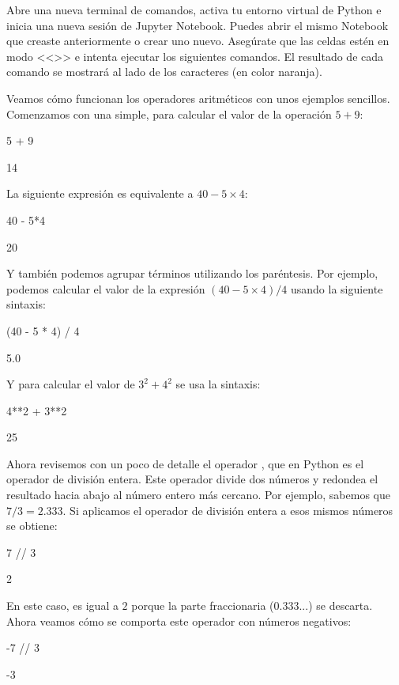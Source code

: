Abre una nueva terminal de comandos, activa tu entorno virtual de Python e inicia una nueva sesión de Jupyter Notebook. Puedes abrir el mismo Notebook que creaste anteriormente o crear uno nuevo. Asegúrate que las celdas estén en modo <<>> e intenta ejecutar los siguientes comandos. El resultado de cada comando se mostrará al lado de los caracteres {\color{myorange}\pynorm{[]:}} (en color naranja). 

Veamos cómo funcionan los operadores aritméticos con unos ejemplos sencillos. Comenzamos con una simple, para calcular el valor de la operación $5+9$:

\begin{pyin}
5 + 9
\end{pyin}
\begin{pyout}
14
\end{pyout}

La siguiente expresión es equivalente a $40 - 5\times 4$:
\begin{pyin}
40 - 5*4
\end{pyin}
\begin{pyout}
20
\end{pyout}

Y también podemos agrupar términos utilizando los paréntesis. Por ejemplo, podemos calcular el valor de la expresión $(40 - 5\times 4)/4$ usando la siguiente sintaxis:
\begin{pyin}
(40 - 5 * 4) / 4
\end{pyin}
\begin{pyout}
5.0
\end{pyout}

Y para calcular el valor de $3^2 + 4^2$ se usa la sintaxis:
\begin{pyin}
4**2 + 3**2
\end{pyin}
\begin{pyout}
25
\end{pyout}

Ahora revisemos con un poco de detalle el operador \pynorm{//}, que en Python es el operador de división entera. Este operador divide dos números y redondea el resultado hacia abajo al número entero más cercano. Por ejemplo, sabemos que $7/3 = 2.333$. Si aplicamos el operador de división entera a esos mismos números se obtiene:
\begin{pyin}
7 // 3
\end{pyin}
\begin{pyout}
2
\end{pyout}

En este caso,  es igual a $2$ porque la parte fraccionaria ($0.333...$) se descarta. Ahora veamos cómo se comporta este operador con números negativos:
\begin{pyin}
-7 // 3
\end{pyin}
\begin{pyout}
-3
\end{pyout}

